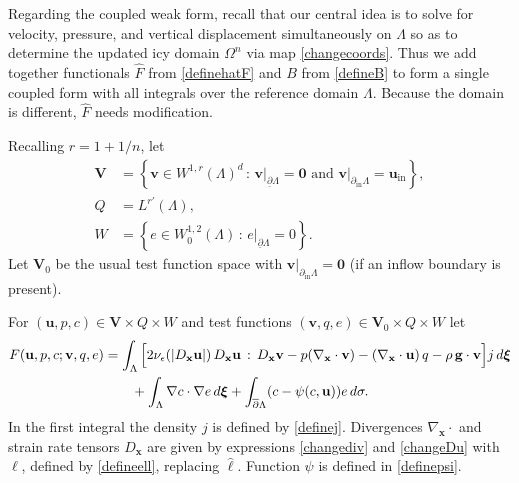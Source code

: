 \documentclass[letterpaper,final,12pt,reqno]{amsart}
\newcommand{\eps}{\epsilon}
\newcommand{\grad}{\nabla}
\newcommand{\bu}{\mathbf{u}}
\newcommand{\bv}{\mathbf{v}}
\newcommand{\bx}{\mathbf{x}}
\newcommand{\bV}{\mathbf{V}}
\newcommand{\bxi}{\bm{\xi}}
\newcommand{\bzero}{\bm{0}}
\begin{document}
Regarding the coupled weak form, recall that our central idea is to solve for velocity, pressure, and vertical displacement simultaneously on $\Lambda$ so as to determine the updated icy domain $\Omega^n$ via map \eqref{changecoords}.  Thus we add together functionals $\hat F$ from \eqref{definehatF} and $B$ from \eqref{defineB} to form a single coupled form with all integrals over the reference domain $\Lambda$.  Because the domain is different, $\hat F$ needs modification.

Recalling $r = 1+1/n$, let
\begin{align*}
\bV &= \left\{\bv \in W^{1,r}(\Lambda)^d\,:\,\bv\big|_{\underline{\partial} \Lambda}=\bzero \text{ and } \bv\big|_{\partial_{\text{in}} \Lambda} = \bu_{\text{in}}\right\}, \\
Q   &= L^{r'}(\Lambda), \\
W   &= \left\{e \in W_0^{1,2}(\Lambda)\,:\,e\big|_{\underline{\partial} \Lambda} = 0\right\}.
\end{align*}
Let $\bV_0$ be the usual test function space with $\bv\big|_{\partial_{\text{in}} \Lambda} = \bzero$ (if an inflow boundary is present).

For $(\bu,p,c) \in \bV\times Q\times W$ and test functions $(\bv,q,e) \in \bV_0\times Q\times W$ let
\begin{align}
F(\bu,p,c;\bv,q,e) &= \int_{\Lambda} \Big[2 \nu_\eps(|D_\bx\bu|)\, D_\bx\bu\,:\,D_\bx\bv - p (\nabla_\bx \cdot \bv) - \left(\nabla_\bx \cdot \bu\right) q - \rho\, \mathbf{g} \cdot \bv\Big] j \,d\bxi \notag \\
&\qquad + \int_\Lambda \grad c \cdot \grad e \,d\bxi + \int_{\overline{\partial} \Lambda} (c - \psi(c,\bu)) e\,d\sigma. \label{defineF}
\end{align}
In the first integral the density $j$ is defined by \eqref{definej}.  Divergences $\grad_\bx \cdot$ and strain rate tensors $D_\bx$ are given by expressions \eqref{changediv} and \eqref{changeDu} with $\ell$, defined by \eqref{defineell}, replacing $\hat\ell$.  Function $\psi$ is defined in \eqref{definepsi}.
\end{document}
